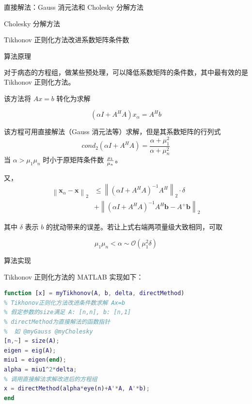 \documentclass[a4paper]{article}
\begin{document}
\begin{multicols}{2}
\begin{section}{直接解法：Gauss 消元法和 Cholesky 分解方法}
\begin{subsection}{Cholesky 分解方法}
	\end{subsection}
	
\end{section}

\begin{section}{Tikhonov 正则化方法改进系数矩阵条件数}

	\begin{subsection}{算法原理}
	
		对于病态的方程组，做某些预处理，可以降低系数矩阵的条件数，其中最有效的是 Tikhonov 正则化方法。
		
		该方法将 $Ax=b$ 转化为求解 
		
		$$(\alpha I+A^HA)x_{\alpha} = A^Hb$$
		
		该方程可用直接解法（Gauss 消元法等）求解，但是其系数矩阵的行列式 $$cond_2(\alpha I+A^HA) = {\frac{\alpha+\mu_{1}^{2}}{\alpha+\mu_{n}^{2}}}$$ 当 $\alpha > \mu_1\mu_n$ 时小于原矩阵条件数 $\mu_1\over\mu_n$。
		
		又，
		\begin{align*}
		  \left\|\mathbf{x}_{\alpha}-\mathbf{x}\right\|_{2} &\leq\left\|\left(\alpha I+A^{H} A\right)^{-1} A^{H}\right\|_{2} \cdot \delta \\
		  &+\left\|\left(\alpha I+A^{H} A\right)^{-1} A^{H} \mathbf{b}-A^{+} \mathbf{b}\right\|_{2}
		\end{align*}
			
		其中 $\delta$ 表示 $b$ 的扰动带来的误差。若让上式右端两项量级大致相同，可取
		
		$$\mu_{1} \mu_{n}<\alpha \sim \mathcal{O}\left(\mu_{1}^{2} \delta\right)$$
		
	\end{subsection}
	
	\begin{subsubsection}{算法实现}
	
		Tikhonov 正则化方法的 MATLAB 实现如下：
		
		\begin{lstlisting}[language=Matlab]
function [x] = myTikhonov(A, b, delta, directMethod)
% Tikhonov正则化方法改进条件数求解 Ax=b
% 假定参数的size满足 A: [n,n], b: [n,1]
% directMethod为直接解法的函数指针
%  如 @myGauss @myCholesky
[n,~] = size(A);
eigen = eig(A);
miu1 = eigen(end);
alpha = miu1^2*delta;
% 调用直接解法求解改进后的方程组
x = directMethod(alpha*eye(n)+A'*A, A'*b);
end

		\end{lstlisting}
	
	\end{subsubsection}


\end{section}
\end{multicols}
\end{document}
